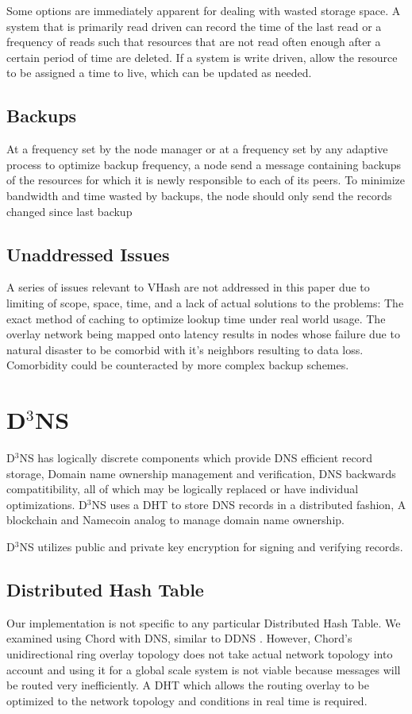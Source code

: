 \documentclass[11pt]{IEEEtran} %
\begin{document}
Some options are immediately apparent for dealing with wasted storage space. A system that is primarily read driven can record the time of the last read or a frequency of reads such that resources that are not read often enough after a certain period of time are deleted. If a system is write driven, allow the resource to be assigned a time to live, which can be updated as needed.

\subsection{Backups}
At a frequency set by the node manager or at a frequency set by any adaptive process to optimize backup frequency, a node send a message containing backups of the resources for which it is newly responsible to each of its peers. To minimize bandwidth and time wasted by backups, the node should only send the records changed since last backup

\subsection{Unaddressed Issues}
A series of issues relevant to VHash are not addressed in this paper due to limiting of scope, space, time, and a lack of actual solutions to the problems: The exact method of caching to optimize lookup time under real world usage. The overlay network being mapped onto latency results in nodes whose failure due to natural disaster to be comorbid with it's neighbors resulting to data loss. Comorbidity could be counteracted by more complex backup schemes.

\section{D$^{3}$NS}
D$^{3}$NS has logically discrete components which provide DNS efficient record storage, Domain name ownership management and verification, DNS backwards compatitibility, all of which may be logically replaced or have individual optimizations. D$^{3}$NS uses a DHT to store DNS records in a distributed fashion, A blockchain and Namecoin\cite{namecoin} analog to manage domain name ownership.

D$^{3}$NS utilizes public and private key encryption for signing and verifying records.


\subsection{Distributed Hash Table}
Our implementation is not specific to any particular Distributed Hash Table.  We examined using Chord \cite{chord} with DNS, similar to DDNS \cite{cox}.  However, Chord’s unidirectional ring overlay topology does not take actual network topology into account and using it for a global scale system is not viable because messages will be routed very inefficiently. A DHT which allows the routing overlay to be optimized to the network topology and conditions in real time is required.
\end{document}
